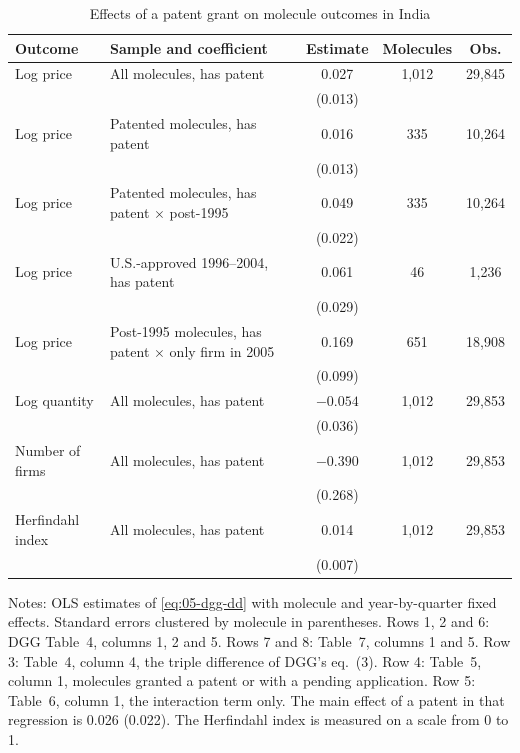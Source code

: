 \begin{table}[htbp]
\centering
\caption{Effects of a patent grant on molecule outcomes in India}\label{tab:05-dgg}
\small
\begin{tabular}{l>{\raggedright\arraybackslash}p{5.2cm}ccc}
\toprule
Outcome & Sample and coefficient & Estimate & Molecules & Obs. \\
\midrule
Log price & All molecules, has patent & 0.027 & 1,012 & 29,845 \\
 & & (0.013) & & \\
Log price & Patented molecules, has patent & 0.016 & 335 & 10,264 \\
 & & (0.013) & & \\
Log price & Patented molecules, has patent $\times$ post-1995 & 0.049 & 335 & 10,264 \\
 & & (0.022) & & \\
Log price & U.S.-approved 1996--2004, has patent & 0.061 & 46 & 1,236 \\
 & & (0.029) & & \\
Log price & Post-1995 molecules, has patent $\times$ only firm in 2005 & 0.169 & 651 & 18,908 \\
 & & (0.099) & & \\
Log quantity & All molecules, has patent & $-0.054$ & 1,012 & 29,853 \\
 & & (0.036) & & \\
Number of firms & All molecules, has patent & $-0.390$ & 1,012 & 29,853 \\
 & & (0.268) & & \\
Herfindahl index & All molecules, has patent & 0.014 & 1,012 & 29,853 \\
 & & (0.007) & & \\
\bottomrule
\end{tabular}
\par\smallskip
\begin{minipage}{0.94\textwidth}\footnotesize
Notes: OLS estimates of \eqref{eq:05-dgg-dd} with molecule and year-by-quarter fixed effects. Standard errors clustered
by molecule in parentheses. Rows 1, 2 and 6: DGG Table~4, columns 1, 2 and 5. Rows 7 and 8: Table~7, columns 1 and
5. Row 3:
Table~4, column 4, the triple difference of DGG's eq.~(3). Row 4: Table~5, column 1, molecules granted a patent or
with a pending application. Row 5: Table~6, column 1, the interaction term only. The main effect of a patent in that
regression is 0.026 (0.022). The Herfindahl index is measured on a scale from 0 to 1.
\end{minipage}
\end{table}

